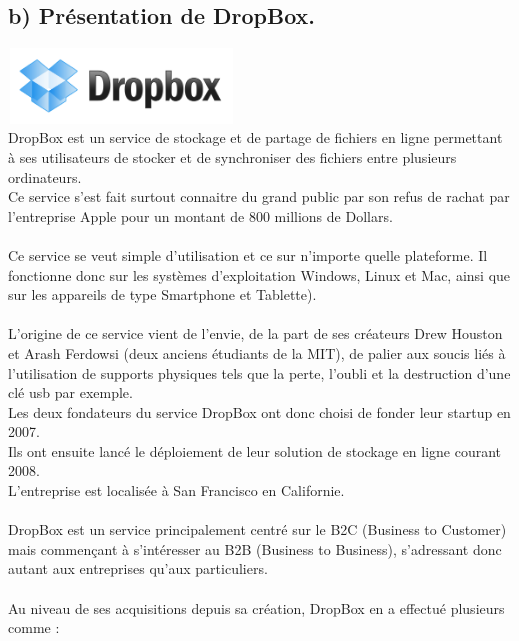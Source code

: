 \documentclass[a4paper, 10pt]{article}
\begin{document}
\subsection*{b) Présentation de DropBox.}
\includegraphics[height = 2cm, width = 6cm]{jpg/dropbox_logo.png}\\
\indent
DropBox est un service de stockage et de partage de fichiers en ligne permettant à ses utilisateurs de stocker et
de synchroniser des fichiers entre plusieurs ordinateurs.\\
Ce service s'est fait surtout connaitre du grand public par son refus de rachat
par l'entreprise Apple pour un montant de 800 millions de Dollars.\\ \\
Ce service se veut simple d'utilisation et ce sur n'importe quelle plateforme.
Il fonctionne donc sur les systèmes d'exploitation Windows, Linux et Mac, ainsi que sur les appareils de type Smartphone et Tablette).\\ \\
L'origine de ce service vient de l'envie, de la part de ses créateurs Drew Houston et Arash Ferdowsi (deux anciens étudiants de la MIT),
de palier aux soucis liés à l'utilisation de supports physiques tels que la perte, l'oubli et la destruction d'une clé usb par exemple.\\
Les deux fondateurs du service DropBox ont donc choisi de fonder leur startup en 2007.\\
Ils ont ensuite lancé le déploiement de leur solution de stockage en ligne courant 2008.\\
L'entreprise est localisée à San Francisco en Californie.\\ \\
DropBox est un service principalement centré sur le B2C (Business to Customer) mais commençant à s'intéresser au B2B (Business to Business),
s'adressant donc autant aux entreprises qu'aux particuliers.\\ \\
Au niveau de ses acquisitions depuis sa création, DropBox en a effectué plusieurs comme :
\end{document}
